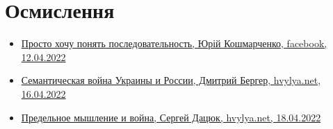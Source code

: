  
 
 
 
 
\section{Осмислення}
\label{sec:topics.vojna.osmyslenie}

\begin{itemize} %

\item \hyperlink{12_04_2022.fb.koshmarchenko_jurij.1.posledovatelnost}{%
Просто хочу понять последовательность, Юрій Кошмарченко, facebook, 12.04.2022%
}

\item \hyperlink{16_04_2022.stz.news.ua.hvylya.1.semantic_war_ukrros}{%
Семантическая война Украины и России, Дмитрий Бергер, hvylya.net, 16.04.2022
}

\item \hyperlink{18_04_2022.stz.news.ua.hvylya.1.predelnoje_myshlenie_i_vojna}{%
Предельное мышление и война, Сергей Дацюк, hvylya.net, 18.04.2022%
}


\end{itemize} %
